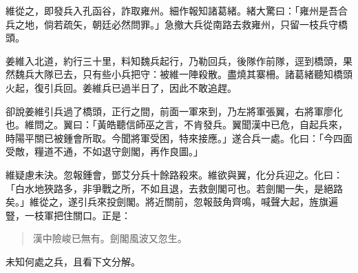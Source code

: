 維從之，即發兵入孔函谷，詐取雍州。細作報知諸葛緒。緒大驚曰：「雍州是吾合兵之地，倘若疏矢，朝廷必然問罪。」急撤大兵從南路去救雍州，只留一枝兵守橋頭。

姜維入北道，約行三十里，料知魏兵起行，乃勒回兵，後隊作前隊，逕到橋頭，果然魏兵大隊已去，只有些小兵把守：被維一陣殺散。盡燒其寨柵。諸葛緒聽知橋頭火起，復引兵回。姜維兵已過半日了，因此不敢追趕。

卻說姜維引兵過了橋頭，正行之間，前面一軍來到，乃左將軍張翼，右將軍廖化也。維問之。翼曰：「黃皓聽信師巫之言，不肯發兵。翼聞漢中已危，自起兵來，時陽平關已被鍾會所取。今聞將軍受困，特來接應。」遂合兵一處。化曰：「今四面受敵，糧道不通，不如退守劍閣，再作良圖。」

維疑慮未決。忽報鍾會，鄧艾分兵十餘路殺來。維欲與翼，化分兵迎之。化曰：「白水地狹路多，非爭戰之所，不如且退，去救劍閣可也。若劍閣一失，是絕路矣。」維從之，遂引兵來投劍閣。將近關前，忽報鼓角齊鳴，喊聲大起，旌旗遍豎，一枝軍把住關口。正是：

\begin{quote}
漢中險峻已無有。劍閣風波又忽生。
\end{quote}

未知何處之兵，且看下文分解。
